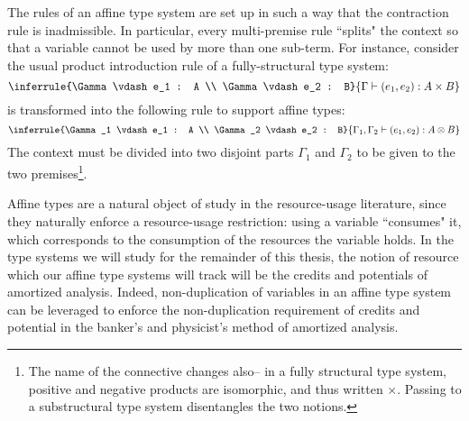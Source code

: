 The rules of an affine type system are set up in such a way that the contraction rule is inadmissible. In particular, every multi-premise rule ``splits" the context so that a variable cannot be used by more than one sub-term. For instance, consider the usual product introduction rule of a fully-structural type system:
$$
\inferrule{\Gamma \vdash e_1 : A \\ \Gamma \vdash e_2 : B}{\Gamma \vdash (e_1,e_2) : A \times B}
$$
is transformed into the following rule to support affine types:
$$
\inferrule{\Gamma_1 \vdash e_1 : A \\ \Gamma_2 \vdash e_2 : B}{\Gamma_1,\Gamma_2 \vdash (e_1,e_2) : A \otimes B}
$$
The context must be divided into two disjoint parts $\Gamma_1$ and $\Gamma_2$ to be given to the two premises\footnote{
The name of the connective changes also-- in a fully structural type system, positive and negative products are isomorphic, and thus written $\times$. Passing to a substructural type system disentangles the two notions.
}.

Affine types are a natural object of study in the resource-usage literature, since they naturally enforce a resource-usage restriction: using a variable ``consumes" it, which corresponds to the consumption of the resources the variable holds. In the type systems we will study for the remainder of this thesis, the notion of resource which our affine type systems will track will be the credits and potentials of amortized analysis. Indeed, non-duplication of variables in an affine type system can be leveraged to enforce the non-duplication requirement of credits and potential in the banker's and physicist's method of amortized analysis.

